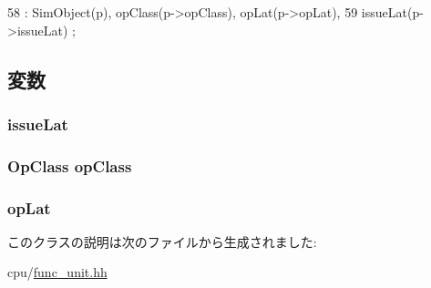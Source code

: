 \begin{DoxyCode}
58         : SimObject(p), opClass(p->opClass), opLat(p->opLat),
59           issueLat(p->issueLat) {};
\end{DoxyCode}


\subsection{変数}
\hypertarget{classOpDesc_a92d0f4d2dc537df17136cc8e77d566b4}{
\subsubsection[{issueLat}]{ {\bf issueLat}}}
\label{classOpDesc_a92d0f4d2dc537df17136cc8e77d566b4}
\hypertarget{classOpDesc_a164f0a00140939320887fa6a85757541}{
\subsubsection[{opClass}]{\setlength{\rightskip}{0pt plus 5cm}OpClass {\bf opClass}}}
\label{classOpDesc_a164f0a00140939320887fa6a85757541}
\hypertarget{classOpDesc_a91d8272e62b680a821b9dda36fdebea9}{
\subsubsection[{opLat}]{ {\bf opLat}}}
\label{classOpDesc_a91d8272e62b680a821b9dda36fdebea9}


このクラスの説明は次のファイルから生成されました:\begin{DoxyCompactItemize}
\item 
cpu/\hyperlink{func__unit_8hh}{func\_\-unit.hh}\end{DoxyCompactItemize}
